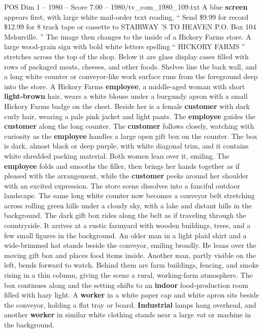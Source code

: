 \begin{textsample}{POS Dim 1 – 1980 – Score 7.00 – 1980/tv\_com\_1980\_109.txt}  \label{ex:f1_pos_057}
A blue \textbf{screen} appears first, with large white mail-order text reading, “ Send \$9.99 for record \$12.99 for 8 track tape or cassette to STAIRWAY ’S TO HEAVEN P.O.
Box 104 Melonville. ” The image then changes to the inside of a Hickory Farms store.
A large wood-grain sign with bold white letters spelling “ HICKORY FARMS ” stretches across the top of the shop.
Below it are glass display cases filled with rows of packaged meats, cheeses, and other foods.
Shelves line the back wall, and a long white counter or conveyor-like work surface runs from the foreground deep into the store.
A Hickory Farms \textbf{employee}, a middle-aged woman with short \textbf{light-brown} hair, wears a white blouse under a burgundy apron with a small Hickory Farms badge on the chest.
Beside her is a female \textbf{customer} with dark curly hair, wearing a pale pink jacket and light pants.
The \textbf{employee} guides the \textbf{customer} along the long counter.
The \textbf{customer} follows closely, watching with curiosity as the \textbf{employee} handles a large open gift box on the counter.
The box is dark, almost black or deep purple, with white diagonal trim, and it contains white shredded packing material.
Both women lean over it, smiling.
The \textbf{employee} folds and smooths the filler, then brings her hands together as if pleased with the arrangement, while the \textbf{customer} peeks around her shoulder with an excited expression.
The store scene dissolves into a fanciful outdoor landscape.
The same long white counter now becomes a conveyor belt stretching across rolling green hills under a cloudy sky, with a lake and distant hills in the background.
The dark gift box rides along the belt as if traveling through the countryside.
It arrives at a rustic farmyard with wooden buildings, trees, and a few small figures in the background.
An older man in a light plaid shirt and a wide-brimmed hat stands beside the conveyor, smiling broadly.
He leans over the moving gift box and places food items inside.
Another man, partly visible on the left, bends forward to watch.
Behind them are farm buildings, fencing, and smoke rising in a thin column, giving the scene a rural, working-farm atmosphere.
The box continues along and the setting shifts to an \textbf{indoor} food-production room filled with hazy light.
A \textbf{worker} in a white paper cap and white apron sits beside the conveyor, holding a flat tray or board. \textbf{Industrial} lamps hang overhead, and another \textbf{worker} in similar white clothing stands near a large vat or machine in the background.

\end{textsample}
